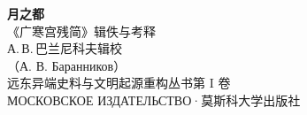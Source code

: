 \clearpage
\thispagestyle{empty}
\begin{center}
\vspace*{28mm}
{\sffamily\bfseries\fontsize{22pt}{30pt}\selectfont 月\quad 之\quad 都}\\[6mm]
{\sffamily\fontsize{13pt}{20pt}\selectfont 《广寒宫残简》辑佚与考释}\\[16mm]
{\large А.\,В.\,巴兰尼科夫\quad 辑校}\\[4mm]
{\footnotesize\color{pencil}（А. В. Баранников）}\\[26mm]
{\sffamily\small 远东异端史料与文明起源重构丛书\quad 第 I 卷}\\[3mm]
{\sffamily\small МОСКОВСКОЕ ИЗДАТЕЛЬСТВО\quad ·\quad 莫斯科大学出版社}
\end{center}
\clearpage

